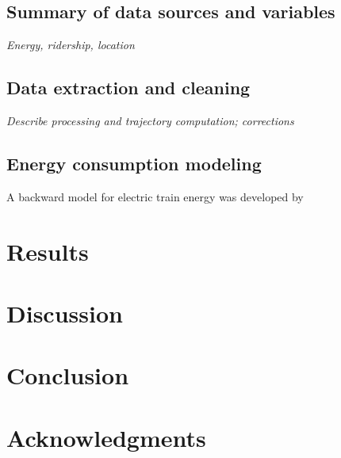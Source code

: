 \documentclass[ review, 11pt]{elsarticle}
\newcommand{\?}{\stackrel{?}{=}}
\begin{document}
\subsection{Summary of data sources and variables}
{\it Energy, ridership, location}

\subsection{Data extraction and cleaning}
{\it Describe processing and trajectory computation; corrections}

\subsection{Energy consumption modeling}
A backward model for electric train energy was developed by \cite{wang2017electric}

\section{Results}

\section{Discussion}

\section{Conclusion}

\section*{Acknowledgments}



\end{document}
